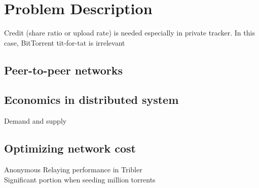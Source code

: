 \chapter{Problem Description}
\label{chp:probdesc}

Credit (share ratio or upload rate) is needed especially in private tracker. In this case, BitTorrent tit-for-tat is irrelevant \cite{2010:pubpriv:meulpolder}

\section{Peer-to-peer networks}

\section{Economics in distributed system}
Demand and supply \cite{2009:demandsupplyres:andrade}

\section{Optimizing network cost}
Anonymous Relaying performance in Tribler \cite{2015:onionroutetribler:stokkink}\\
Significant portion when seeding million torrents \cite{2012:milliontorrent:arvid}